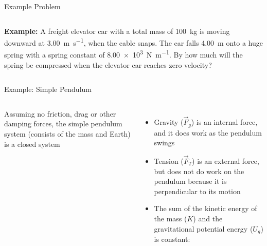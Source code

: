 \documentclass[12pt,compress,aspectratio=169]{beamer}
\begin{document}
\begin{frame}{Example Problem}
  \begin{columns}
    \textbf{Example:} A freight elevator car with a total mass of
    \SI{100}{\kilo\gram} is moving downward at \SI{3.00}{\metre\per\second},
    when the cable snaps. The car falls \SI{4.00}{\metre} onto a huge spring
    with a spring constant of \SI{8.00e3}{\newton\per\metre}. By how much will
    the spring be compressed when the elevator car reaches zero velocity?

  \end{columns}
\end{frame}




\begin{frame}{Example: Simple Pendulum}
  \begin{columns}
    Assuming no friction, drag or other damping forces, the simple pendulum
    system (consists of the mass and Earth) is a closed system
    \begin{itemize}
    \item Gravity ($\vec F_g$) is an internal force, and it does work as the
      pendulum swings
    \item Tension ($\vec F_T$) is an external force, but does not do work on
      the pendulum because it is perpendicular to its motion
    \item The sum of the kinetic energy of the mass ($K$) and the gravitational
      potential energy ($U_g$) is constant:

    \end{itemize}
    
    \centering
  \end{columns}
\end{frame}
\end{document}
